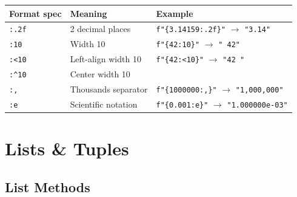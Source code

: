 \documentclass[oneside]{book}
\begin{document}
\begin{center}
\begin{tabular}{lll}
\toprule
\textbf{Format spec} & \textbf{Meaning} & \textbf{Example} \\
\midrule
\texttt{:.2f}   & 2 decimal places & \texttt{f"\{3.14159:.2f\}"} $\to$ \texttt{"3.14"} \\
\texttt{:10}    & Width 10         & \texttt{f"\{42:10\}"} $\to$ \texttt{"        42"} \\
\texttt{:<10}   & Left-align width 10 & \texttt{f"\{42:<10\}"} $\to$ \texttt{"42        "} \\
\texttt{:\textasciicircum{}10}   & Center width 10  & \\
\texttt{:,}     & Thousands separator & \texttt{f"\{1000000:,\}"} $\to$ \texttt{"1,000,000"} \\
\texttt{:e}     & Scientific notation & \texttt{f"\{0.001:e\}"} $\to$ \texttt{"1.000000e-03"} \\
\bottomrule
\end{tabular}
\end{center}

\section{Lists \& Tuples}


\subsection*{List Methods}
\end{document}
